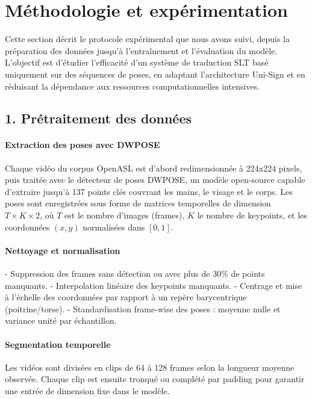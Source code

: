 \section{Méthodologie et expérimentation}

Cette section décrit le protocole expérimental que nous avons suivi, depuis la préparation des données jusqu’à l’entraînement et l’évaluation du modèle. L’objectif est d’étudier l’efficacité d’un système de traduction SLT basé uniquement sur des séquences de poses, en adaptant l’architecture Uni-Sign et en réduisant la dépendance aux ressources computationnelles intensives.

\subsection*{1. Prétraitement des données}

\paragraph{Extraction des poses avec DWPOSE}

Chaque vidéo du corpus OpenASL est d’abord redimensionnée à 224x224 pixels, puis traitée avec le détecteur de poses DWPOSE, un modèle open-source capable d’extraire jusqu’à 137 points clés couvrant les mains, le visage et le corps. Les poses sont enregistrées sous forme de matrices temporelles de dimension $T \times K \times 2$, où $T$ est le nombre d’images (frames), $K$ le nombre de keypoints, et les coordonnées $(x, y)$ normalisées dans $[0,1]$.

\paragraph{Nettoyage et normalisation}

- Suppression des frames sans détection ou avec plus de 30\% de points manquants.
- Interpolation linéaire des keypoints manquants.
- Centrage et mise à l’échelle des coordonnées par rapport à un repère barycentrique (poitrine/torse).
- Standardisation frame-wise des poses : moyenne nulle et variance unité par échantillon.

\paragraph{Segmentation temporelle}

Les vidéos sont divisées en clips de 64 à 128 frames selon la longueur moyenne observée. Chaque clip est ensuite tronqué ou complété par padding pour garantir une entrée de dimension fixe dans le modèle.

